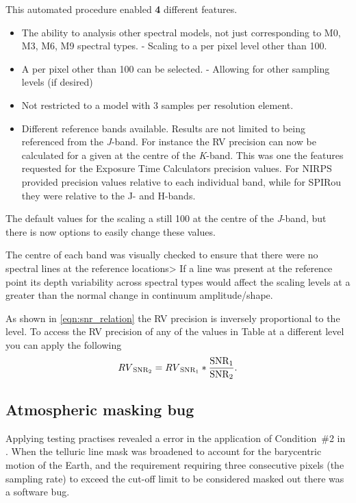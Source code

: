 This automated procedure enabled {\red{}\textbf{4}} different features.
\begin{itemize}
    \setlength\itemsep{-0.3em} %
    \item The ability to analysis other spectral models, not just corresponding to {M0}, {M3}, {M6}, {M9} spectral types.
    - Scaling to a \snr{} per pixel level other than 100.
    \item A \snr{} per pixel other than 100 can be selected.
    - Allowing for other sampling levels (if desired)
    \item Not restricted to a model with 3 samples per resolution element.
    \item Different reference bands available.
    Results are not limited to being referenced from the \textit{J}-band.
    For instance the {RV} precision can now be calculated for a given \snr{} at the centre of the \textit{K}-band.
    This was one the features requested for the Exposure Time Calculators precision values.
    For {NIRPS}  provided precision values relative to each individual band, while for {SPIRou} they were relative to the {J}- and {H}-bands.
\end{itemize}

The default values for the \snr{} scaling a still 100 at the centre of the \textit{J}-band, but there is now options to easily change these values.

The centre of each band was visually checked to ensure that there were no spectral lines at the reference locations> If a line was present at the reference point its depth variability across spectral types would affect the \snr{} scaling levels at a greater than the normal change in continuum amplitude/shape.

As shown in \cref{eqn:snr_relation} the {RV} precision is inversely proportional to the \snr{} level.
To access the {RV} precision of any of the values in Table at a different \snr{} level you can apply the following
\begin{equation}
{RV}_{{\textrm{SNR}{}}_{2}} = {RV}_{{\textrm{SNR}{}}_{1}} * \frac{{\textrm{SNR}{}}_{1}}{{\textrm{SNR}{}}_{2}}.
\end{equation}




\subsection{Atmospheric masking bug}
\label{subsec:condition_two_bug}
Applying testing practises revealed a error in the application of Condition~\#2 in \citep{figueira_radial_2016}.
When the telluric line mask was broadened to account for the barycentric motion of the Earth, and the requirement requiring three consecutive pixels (the sampling rate) to exceed the cut-off limit to be considered masked out there was a software bug.


